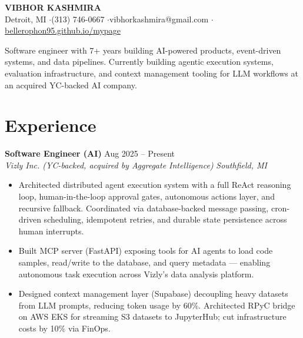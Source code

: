 \documentclass[10pt,letterpaper]{article}
\newcommand{\role}[4]{%
  \vspace{3pt}
  \noindent\textbf{#1} \hfill #2 \\
  \textit{#3} \hfill \textit{#4}
  \vspace{1pt}
}
\begin{document}
\begin{center}
  {\Large\bfseries VIBHOR KASHMIRA} \\[3pt]
  Detroit, MI \enspace$\cdot$\enspace (313) 746-0667 \enspace$\cdot$\enspace vibhorkashmira@gmail.com \enspace$\cdot$\enspace \href{https://bellerophon95.github.io/mypage}{bellerophon95.github.io/mypage}
\end{center}

\vspace{-4pt}
\noindent Software engineer with 7+ years building AI-powered products, event-driven systems, and data pipelines. Currently building agentic execution systems, evaluation infrastructure, and context management tooling for LLM workflows at an acquired YC-backed AI company.

\section{Experience}

\role{Software Engineer (AI)}{Aug 2025 -- Present}{Vizly Inc. (YC-backed, acquired by Aggregate Intelligence)}{Southfield, MI}
\begin{itemize}
  \item Architected distributed agent execution system with a full ReAct reasoning loop, human-in-the-loop approval gates, autonomous actions layer, and recursive fallback. Coordinated via database-backed message passing, cron-driven scheduling, idempotent retries, and durable state persistence across human interrupts.
  \item Built MCP server (FastAPI) exposing tools for AI agents to load code samples, read/write to the database, and query metadata --- enabling autonomous task execution across Vizly's data analysis platform.
  \item Designed context management layer (Supabase) decoupling heavy datasets from LLM prompts, reducing token usage by 60\%. Architected RPyC bridge on AWS EKS for streaming S3 datasets to JupyterHub; cut infrastructure costs by 10\% via FinOps.
\end{itemize}
\end{document}
